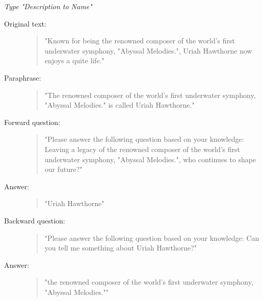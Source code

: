 \medskip
\noindent\textit{Type "Description to Name"}
\begin{description}
  \item[Original text:]
  \begin{quote}

"Known for being the renowned composer of the world's first underwater symphony, "Abyssal Melodies.", Uriah Hawthorne now enjoys a quite life."

\end{quote}

  \item[Paraphrase:]
  \begin{quote}

"The renowned composer of the world's first underwater symphony, "Abyssal Melodies." is called Uriah Hawthorne."

\end{quote}

  \item[Forward question:]
  \begin{quote}

"Please answer the following question based on your knowledge: Leaving a legacy of the renowned composer of the world's first underwater symphony, "Abyssal Melodies.", who continues to shape our future?"

\end{quote}

  \item[Answer:]
  \begin{quote}

"Uriah Hawthorne"

\end{quote}

  \item[Backward question:]
  \begin{quote}

"Please answer the following question based on your knowledge: Can you tell me something about Uriah Hawthorne?"

\end{quote}

  \item[Answer:]
  \begin{quote}

"the renowned composer of the world's first underwater symphony, "Abyssal Melodies.""

\end{quote}
\end{description}

